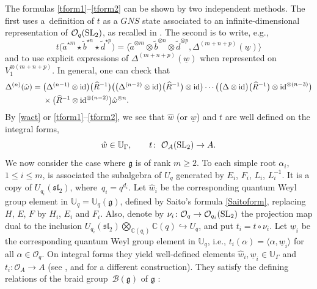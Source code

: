 \documentclass[10pt,a4paper]{amsart}
\numberwithin{equation}{section}
\theoremstyle{definition}
\newcommand{\mUq}{\mathbb{U}_q}
\newcommand{\mc}{\mathbb{C}}
\newcommand{\Oo}{{\mathcal O}}
\newcommand{\ra}{\rightarrow}
\begin{document}
The formulas \eqref{tform1}--\eqref{tform2} can be shown by two independent methods. The first uses a~definition of $t$ as a $GNS$ state associated to an infinite-dimensional representation of $\Oo_q({\rm SL}_2)$, as recalled in \cite[Section 1.6]{DC-L}. The second is to write, e.g.,
\begin{equation}\label{twformcop}
t\big(\tilde{a}^{\star m}\star \tilde{b}^{\star n}\star \tilde{d}^{\star p}\big) = \big\langle \tilde{a}^{\otimes m}\otimes \tilde{b}^{\otimes n}\otimes \tilde{d}^{\otimes p}, \Delta^{(m+n+p)}(\underline{w})\big\rangle
\end{equation}
and to use explicit expressions of $\Delta^{(m+n+p)}(\underline{w})$ when represented on $V_1^{\otimes (m+n+p)}$. In general, one can check that
\begin{align*}%
\Delta^{(n)}(\hat{\omega}) ={}&\big( \Delta^{(n-1)} \otimes {\rm id}\big)\big(\widehat{R}^{-1}\big)\big(\big( \Delta^{(n-2)} \otimes {\rm id}\big)\big(\widehat{R}^{-1}\big) \otimes {\rm id}\big)\cdots \big(\big( \Delta \otimes {\rm id}\big)\big(\widehat{R}^{-1}\big) \otimes {\rm id}^{\otimes (n-3)}\big)\\ &\times\big(\widehat{R}^{-1} \otimes {\rm id}^{\otimes (n-2)}\big)\hat{\omega}^{\otimes n}.
\end{align*}
By \eqref{wact} or \eqref{tform1}--\eqref{tform2}, we see that $\hat{w}$ (or $\underline{w}$) and $t$ are well defined on the integral forms,
\[\hat{w} \in \mathbb{U}_{\Gamma},\qquad t \colon\ \Oo_A({\rm SL}_2)\ra A.\]
We now consider the case where $\mathfrak{g}$ is of rank $m\geq 2$. To each simple root $\alpha_i$, $1\leq i\leq m$, is associated the subalgebra of $U_q$ generated by $E_i$, $F_i$, $L_i$, $L_i^{-1}$. It is a copy of $U_{q_i}({\mathfrak{sl}_2})$, where~${q_i = q^{d_i}}$. Let $\hat{w}_i$ be the corresponding quantum Weyl group element in $\mUq = \mUq(\mathfrak{g})$, defined by Saito's formula \eqref{Saitoform}, replacing $H$, $E$, $F$ by $H_i$, $E_i$ and $F_i$. Also, denote by $\nu_i \colon \mathcal{O}_q \ra \mathcal{O}_{q_i}({\rm SL}_2)$ the projection map dual to the inclusion $U_{q_i}({\mathfrak{sl}_2}) \bigotimes_{\mc(q_i)} \mc(q)\hookrightarrow U_q$, and put $t_i = t \circ \nu_i$. Let $\underline{w}_i$ be the corresponding quantum Weyl group element in $\mUq$, i.e., $t_i(\alpha) = \langle \alpha,\underline{w}_i\rangle$ for all $\alpha\in \Oo_q$. On integral forms they yield well-defined elements $\hat{w}_i,\underline{w}_i \in \mathbb{U}_{\Gamma}$ and $t_i\colon \Oo_A \ra A$ (see \cite[Proposition~5.1]{DC-L}, and \cite{Lusztig3} for a different construction). They satisfy the defining relations of the braid group~$\mathcal{B}(\mathfrak{g})$ of $\mathfrak{g}$ \cite{KirRes}:
\end{document}

